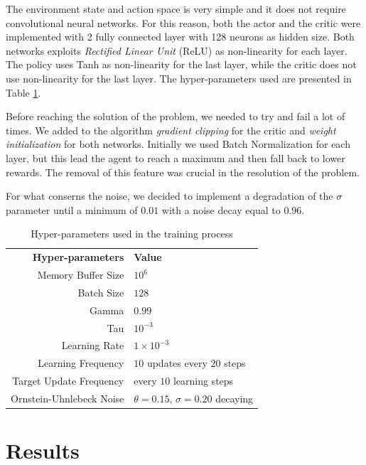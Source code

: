 \documentclass[letterpaper]{article}
\begin{document}
The environment state and action space is very simple and it does not require convolutional neural networks. For this reason, both the actor and the critic were implemented with 2 fully connected layer with 128 neurons as hidden size. Both networks exploits \textit{Rectified Linear Unit} (ReLU) as non-linearity for each layer. The policy uses Tanh as non-linearity for the last layer, while the critic does not use non-linearity for the last layer. The hyper-parameters used are presented in Table \ref{table:hp}.

Before reaching the solution of the problem, we needed to try and fail a lot of times. We added to the algorithm \textit{gradient clipping} for the critic and \textit{weight initialization} for both networks. Initially we used Batch Normalization for each layer, but this lead the agent to reach a maximum and then fall back to lower rewards. The removal of this feature was crucial in the resolution of the problem.

For what conserns the noise, we decided to implement a degradation of the $\sigma$ parameter until a minimum of $0.01$ with a noise decay equal to $0.96$.

\begin{table}[]
\begin{tabular}{rl}
\textbf{Hyper-parameters}    & \textbf{Value}        \\
Memory Buffer Size          & $10^6$ \\
Batch Size                  & $128$                    \\
Gamma                       & $0.99$                  \\
Tau                         & $10^{-3}$                 \\
Learning Rate               & $1\times 10^{-3}$                  \\
Learning Frequency          & $10$ updates every $20$ steps            \\
Target Update Frequency        & every $10$ learning steps            \\

Ornstein-Uhnlebeck Noise &  $\theta=0.15$, $\sigma=0.20$ decaying
\end{tabular}
\caption{Hyper-parameters used in the training process}
\label{table:hp}
\end{table}

\section{Results}
\end{document}
